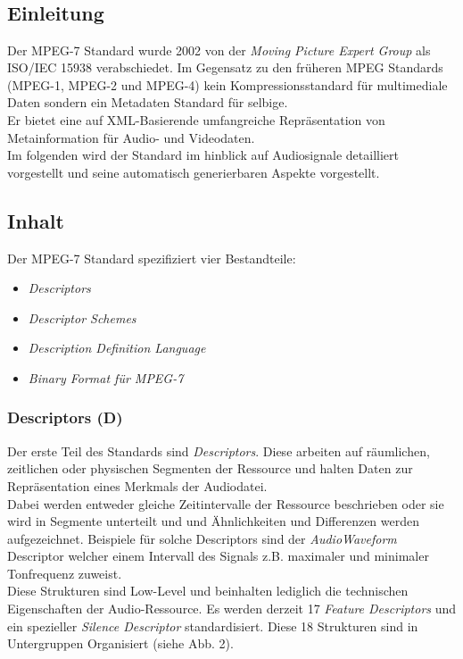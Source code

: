 	\subsection {\\Einleitung}
	
	Der MPEG-7 Standard wurde 2002 von der \emph{Moving Picture Expert Group} als ISO/IEC 15938 verabschiedet. Im Gegensatz zu den früheren MPEG Standards (MPEG-1, MPEG-2 und MPEG-4) kein Kompressionsstandard für multimediale Daten sondern ein Metadaten Standard für selbige.\\Er bietet eine auf XML-Basierende umfangreiche Repräsentation von Metainformation für Audio- und Videodaten.\\Im folgenden wird der Standard im hinblick auf Audiosignale detailliert vorgestellt und seine automatisch generierbaren Aspekte vorgestellt.
	
	\subsection{Inhalt}
	
	Der MPEG-7 Standard spezifiziert vier Bestandteile:
	
	\begin{itemize}
		\item \emph{Descriptors}
		\item \emph{Descriptor Schemes}
		\item \emph{Description Definition Language}
		\item \emph{Binary Format für MPEG-7}
	\end{itemize}
	
	\subsubsection {Descriptors (D)}
	
Der erste Teil des Standards sind \emph{Descriptors}. Diese arbeiten auf räumlichen, zeitlichen oder physischen Segmenten der Ressource und  halten Daten zur Repräsentation eines Merkmals der Audiodatei.\\Dabei werden entweder gleiche Zeitintervalle der Ressource beschrieben oder sie wird in Segmente unterteilt und und Ähnlichkeiten und Differenzen werden aufgezeichnet. Beispiele für solche Descriptors sind der \emph{AudioWaveform} Descriptor welcher einem Intervall des Signals z.B. maximaler und minimaler Tonfrequenz zuweist.\\ Diese Strukturen sind Low-Level und beinhalten lediglich die technischen Eigenschaften der Audio-Ressource. Es werden derzeit 17 \emph{Feature Descriptors} und ein spezieller \emph{Silence Descriptor} standardisiert. Diese 18 Strukturen sind in Untergruppen Organisiert (siehe Abb. 2).\\


